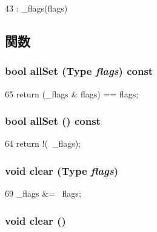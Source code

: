 \begin{DoxyCode}
43 : _flags(flags) {}
\end{DoxyCode}


\subsection{関数}
\hypertarget{classFlags_a69355f25ed4580ab775344e0e3cb67cd}{
\subsubsection[{allSet}]{\setlength{\rightskip}{0pt plus 5cm}bool allSet ({\bf Type} {\em flags}) const}}
\label{classFlags_a69355f25ed4580ab775344e0e3cb67cd}



\begin{DoxyCode}
65 { return (_flags & flags) == flags; }
\end{DoxyCode}
\hypertarget{classFlags_a3f561039db06de9adcd4b1f9babc0a61}{
\subsubsection[{allSet}]{\setlength{\rightskip}{0pt plus 5cm}bool allSet () const}}
\label{classFlags_a3f561039db06de9adcd4b1f9babc0a61}



\begin{DoxyCode}
64 { return !(~_flags); }
\end{DoxyCode}
\hypertarget{classFlags_a3c01e317c823d764c5ad343ae7028185}{
\subsubsection[{clear}]{\setlength{\rightskip}{0pt plus 5cm}void clear ({\bf Type} {\em flags})}}
\label{classFlags_a3c01e317c823d764c5ad343ae7028185}



\begin{DoxyCode}
69 { _flags &= ~flags; }
\end{DoxyCode}
\hypertarget{classFlags_ac8bb3912a3ce86b15842e79d0b421204}{
\subsubsection[{clear}]{\setlength{\rightskip}{0pt plus 5cm}void clear ()}}
\label{classFlags_ac8bb3912a3ce86b15842e79d0b421204}



